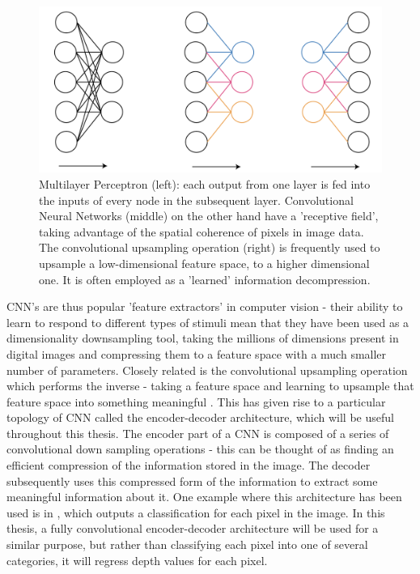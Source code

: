 \documentclass[openany]{book}
\begin{document}
\begin{figure}[tbp]
    \centering
    \includegraphics[width=5in]{images/cnnvsmlp.png}
    
    \caption{Multilayer Perceptron (left): each output from one layer is fed into the inputs of every node in the subsequent layer. Convolutional Neural Networks (middle) on the other hand have a 'receptive field', taking advantage of the spatial coherence of pixels in image data. The convolutional upsampling operation (right) is frequently used to upsample a low-dimensional feature space, to a higher dimensional one. It is often employed as a 'learned' information decompression.}
    
    \label{convexhull}
\end{figure}

CNN's are thus popular 'feature extractors' in computer vision - their ability to learn to respond to different types of stimuli mean that they have been used as a dimensionality downsampling tool, taking the millions of dimensions present in digital images  and compressing them to a feature space with a much smaller number of parameters. Closely related is the convolutional upsampling operation which performs the inverse - taking a feature space and learning to upsample that feature space into something meaningful \cite{long2014fcn}. This has given rise to a particular topology of CNN called the encoder-decoder architecture, which will be useful throughout this thesis. The encoder part of a CNN is composed of a series of convolutional down sampling operations - this can be thought of as finding an efficient compression of the information stored in the image. The decoder subsequently uses this compressed form of the information to extract some meaningful information about it. One example where this architecture has been used is in \cite{long2014fcn}, which outputs a classification for each pixel in the image. In this thesis, a fully convolutional encoder-decoder architecture will be used for a similar purpose, but rather than classifying each pixel into one of several categories, it will regress depth values for each pixel. 
\end{document}
